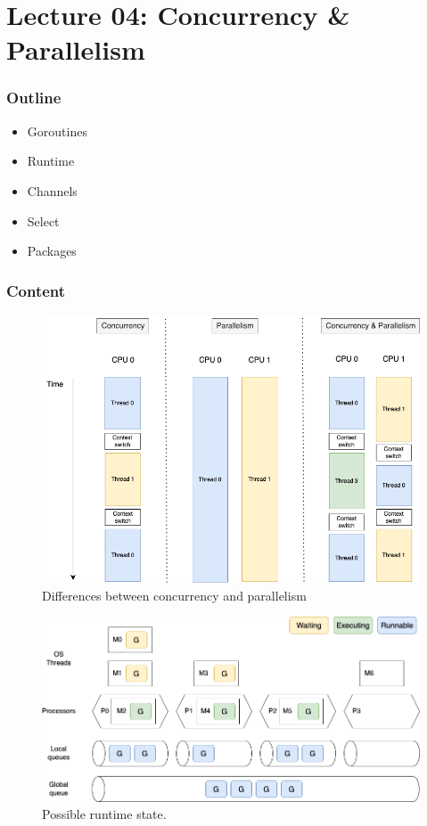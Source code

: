 \documentclass[
  digital,
  color,
  oneside,
  nosansbold,
  nocolorbold,
  lof,
  lot,
]{fithesis4}
\begin{document}
\section{Lecture 04: Concurrency \& Parallelism}

\subsubsection{Outline}

\begin{itemize}
    \item Goroutines
    \item Runtime
    \item Channels
    \item Select
    \item Packages
\end{itemize}

\subsubsection{Content}

\begin{figure}[H]
    \centering
    \includegraphics[width=12cm]{figures/concurrency-parallelism.png}
    \caption{Differences between concurrency and parallelism}
\end{figure}

\begin{figure}[H]
    \centering
    \includegraphics[width=12cm]{figures/scheduling.png}
    \caption{Possible runtime state.}
\end{figure}
\end{document}
